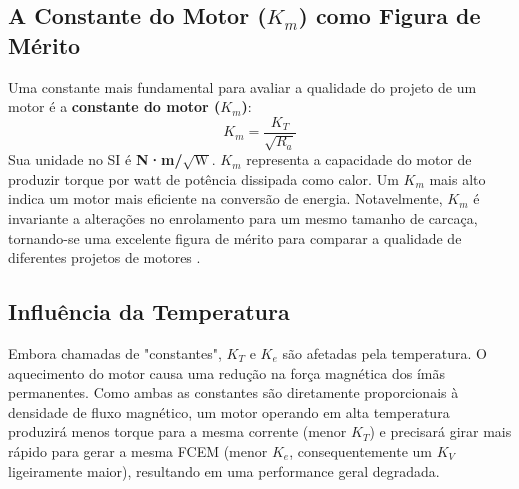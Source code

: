 \documentclass[12pt, a4paper, openright, oneside, brazilian]{abntex2}
\begin{document}
\begin{table}[h!]
\centering
\caption{Unidades de Constantes de Motor e Fatores de Conversão para o SI}
\label{tab:unidades}

\caption*{Fonte:Elaborado pelo autor.}
\end{table}

\subsection{A Constante do Motor ($K_m$) como Figura de Mérito}

Uma constante mais fundamental para avaliar a qualidade do projeto de um motor é a \textbf{constante do motor ($K_m$)}:
\begin{equation}
    K_m = \frac{K_T}{\sqrt{R_a}}
\end{equation}
Sua unidade no SI é \textbf{N·m/$\sqrt{\text{W}}$}. $K_m$ representa a capacidade do motor de produzir torque por watt de potência dissipada como calor. Um $K_m$ mais alto indica um motor mais eficiente na conversão de energia. Notavelmente, $K_m$ é invariante a alterações no enrolamento para um mesmo tamanho de carcaça, tornando-se uma excelente figura de mérito para comparar a qualidade de diferentes projetos de motores \parencite{infineon2011bldc}.

\subsection{Influência da Temperatura}

Embora chamadas de "constantes", $K_T$ e $K_e$ são afetadas pela temperatura. O aquecimento do motor causa uma redução na força magnética dos ímãs permanentes. Como ambas as constantes são diretamente proporcionais à densidade de fluxo magnético, um motor operando em alta temperatura produzirá menos torque para a mesma corrente (menor $K_T$) e precisará girar mais rápido para gerar a mesma FCEM (menor $K_e$, consequentemente um $K_V$ ligeiramente maior), resultando em uma performance geral degradada.
\end{document}
